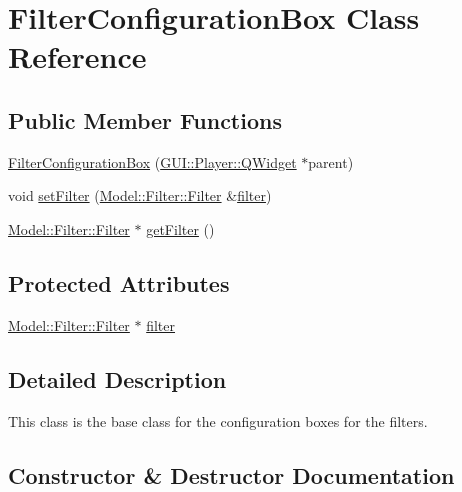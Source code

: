 \hypertarget{classGUI_1_1FilterConfigurationBox}{}\section{Filter\+Configuration\+Box Class Reference}
\label{classGUI_1_1FilterConfigurationBox}
\subsection*{Public Member Functions}
\begin{DoxyCompactItemize}
\item 
\hyperlink{classGUI_1_1FilterConfigurationBox_a8ce61fe43af93f63405d11878fb3b877}{Filter\+Configuration\+Box} (\hyperlink{classGUI_1_1Player_1_1QWidget}{G\+U\+I\+::\+Player\+::\+Q\+Widget} $\ast$parent)
\item 
void \hyperlink{classGUI_1_1FilterConfigurationBox_ad7c0ee00fe3faac7942d75eec2a5342b}{set\+Filter} (\hyperlink{classModel_1_1Filter_1_1Filter}{Model\+::\+Filter\+::\+Filter} \&\hyperlink{classGUI_1_1FilterConfigurationBox_ae919e8286e640d26bcfff7f66cc77ef4}{filter})
\item 
\hyperlink{classModel_1_1Filter_1_1Filter}{Model\+::\+Filter\+::\+Filter} $\ast$ \hyperlink{classGUI_1_1FilterConfigurationBox_acef2029a93f4ab3a538cdb643b9c2613}{get\+Filter} ()
\end{DoxyCompactItemize}
\subsection*{Protected Attributes}
\begin{DoxyCompactItemize}
\item 
\hyperlink{classModel_1_1Filter_1_1Filter}{Model\+::\+Filter\+::\+Filter} $\ast$ \hyperlink{classGUI_1_1FilterConfigurationBox_ae919e8286e640d26bcfff7f66cc77ef4}{filter}
\end{DoxyCompactItemize}


\subsection{Detailed Description}
This class is the base class for the configuration boxes for the filters. 

\subsection{Constructor \& Destructor Documentation}
\hypertarget{classGUI_1_1FilterConfigurationBox_a8ce61fe43af93f63405d11878fb3b877}{}
